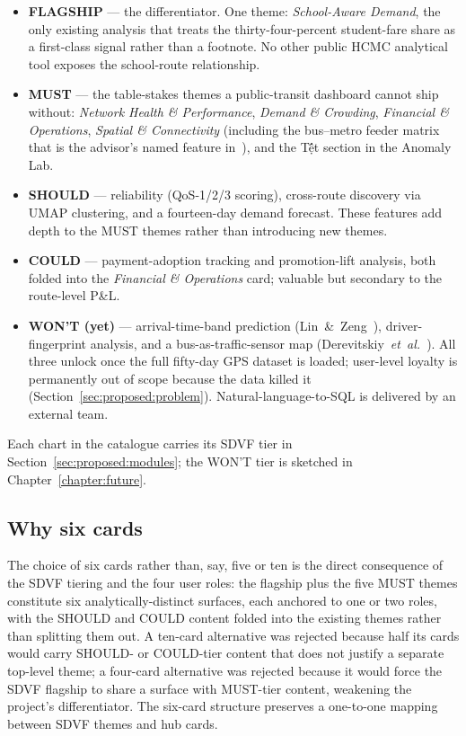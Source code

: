 \begin{itemize}
\item \textbf{FLAGSHIP} --- the differentiator. One theme:
    \emph{School-Aware Demand}, the only existing analysis that
    treats the thirty-four-percent student-fare share as a
    first-class signal rather than a footnote. No other public
    HCMC analytical tool exposes the school-route relationship.
\item \textbf{MUST} --- the table-stakes themes a public-transit
    dashboard cannot ship without: \emph{Network Health \&
    Performance}, \emph{Demand \& Crowding}, \emph{Financial \&
    Operations}, \emph{Spatial \& Connectivity} (including the
    bus--metro feeder matrix that is the advisor's named feature
    in~\cite{thoai2025}), and the T\d ết section in the Anomaly
    Lab.
\item \textbf{SHOULD} --- reliability (QoS-1/2/3 scoring),
    cross-route discovery via UMAP clustering, and a fourteen-day
    demand forecast. These features add depth to the MUST themes
    rather than introducing new themes.
\item \textbf{COULD} --- payment-adoption tracking and
    promotion-lift analysis, both folded into the
    \emph{Financial \& Operations} card; valuable but secondary
    to the route-level P\&L.
\item \textbf{WON'T (yet)} --- arrival-time-band prediction
    (Lin~\&~Zeng~\cite{linzeng2014}), driver-fingerprint analysis,
    and a bus-as-traffic-sensor map
    (Derevitskiy~\textit{et~al.}~\cite{derevitskiy2016}). All
    three unlock once the full fifty-day GPS dataset is loaded;
    user-level loyalty is permanently out of scope because the
    data killed it (Section~\ref{sec:proposed:problem}).
    Natural-language-to-SQL is delivered by an external team.
\end{itemize}

Each chart in the catalogue carries its SDVF tier in
Section~\ref{sec:proposed:modules}; the WON'T tier is sketched
in Chapter~\ref{chapter:future}.

\subsection{Why six cards}

The choice of six cards rather than, say, five or ten is the
direct consequence of the SDVF tiering and the four user roles:
the flagship plus the five MUST themes constitute six
analytically-distinct surfaces, each anchored to one or two
roles, with the SHOULD and COULD content folded into the
existing themes rather than splitting them out. A ten-card
alternative was rejected because half its cards would carry
SHOULD- or COULD-tier content that does not justify a separate
top-level theme; a four-card alternative was rejected because it
would force the SDVF flagship to share a surface with MUST-tier
content, weakening the project's differentiator. The six-card
structure preserves a one-to-one mapping between SDVF themes and
hub cards.
